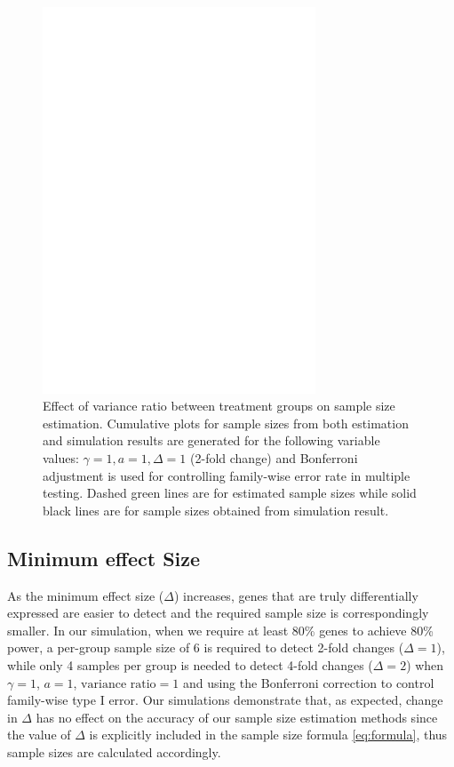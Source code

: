 \documentclass{bioinfo}
\begin{document}
\begin{figure}[h]
  \centerline{\includegraphics*[width=3.2in]{ResVarF.pdf}}
  \caption[Effect of variance ratio between treatment groups on sample size estimation]
  {Effect of variance ratio between treatment groups on sample size estimation.
    Cumulative plots for sample sizes from both estimation and simulation
    results are generated for the following variable values: $\gamma = 1, a = 1, \Delta = 1$ (2-fold
    change) and Bonferroni adjustment is used for controlling family-wise error rate in multiple testing. Dashed green lines are for estimated sample sizes
    while solid black lines are for sample sizes obtained from simulation result.}
  \label{fig:ResVar}
\end{figure}

\subsection{Minimum effect Size}

As the minimum effect size ($\Delta$) increases, genes that are
truly differentially expressed are easier to detect and the
required sample size is correspondingly smaller.  In our
simulation, when we require at least 80\% genes to achieve 80\%
power, a per-group sample size of 6 is required to detect 2-fold
changes ($\Delta = 1$), while only 4 samples per group is needed
to detect 4-fold changes ($\Delta = 2$) when $\gamma=1$, $a=1$,
$\text{variance ratio}=1$ and using the Bonferroni correction to
control family-wise type I error. Our simulations demonstrate
that, as expected, change in $\Delta$ has no effect on the
accuracy of our sample size estimation methods since the value of
$\Delta$ is explicitly included in the sample size formula
\ref{eq:formula}, thus sample sizes are calculated accordingly.
\end{document}
